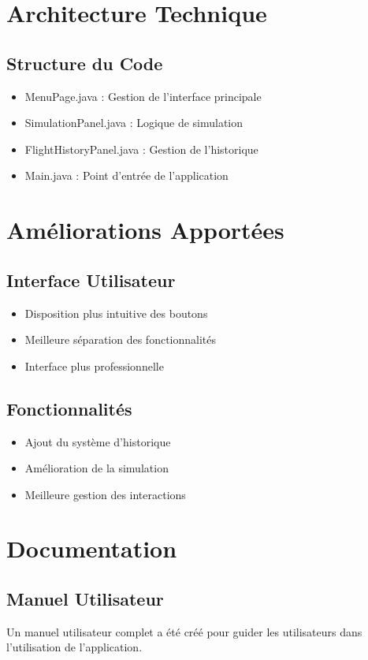 \documentclass[12pt,a4paper]{article}
\begin{document}
\section{Architecture Technique}
\subsection{Structure du Code}
\begin{itemize}
    \item MenuPage.java : Gestion de l'interface principale
    \item SimulationPanel.java : Logique de simulation
    \item FlightHistoryPanel.java : Gestion de l'historique
    \item Main.java : Point d'entrée de l'application
\end{itemize}

\section{Améliorations Apportées}
\subsection{Interface Utilisateur}
\begin{itemize}
    \item Disposition plus intuitive des boutons
    \item Meilleure séparation des fonctionnalités
    \item Interface plus professionnelle
\end{itemize}

\subsection{Fonctionnalités}
\begin{itemize}
    \item Ajout du système d'historique
    \item Amélioration de la simulation
    \item Meilleure gestion des interactions
\end{itemize}

\section{Documentation}
\subsection{Manuel Utilisateur}
Un manuel utilisateur complet a été créé pour guider les utilisateurs dans l'utilisation de l'application.
\end{document}

